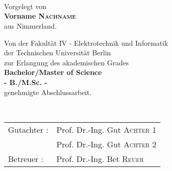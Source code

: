 \begin{titlepage}
\begin{center}
\vspace*{2.0cm}
 \\
\vspace*{0.2cm}
 \\
\vspace*{0.2cm}
 \\

\vspace*{1.5cm}
\noindent \large {Vorgelegt von\\}
\vspace*{0.1cm}
\noindent \large {\bf Vorname \textsc{Nachname}} \\
\vspace*{0.1cm}
\noindent \large {aus Nimmerland.\\}
\vspace*{1.5cm}

\noindent \large {Von der Fakult\"at IV - Elektrotechnik und Informatik} \\
\vspace*{0.1cm}
\noindent \large {der Technischen Universit\"at Berlin} \\
\vspace*{0.1cm}
\noindent \large {zur Erlangung des akademischen Grades} \\
\vspace*{0.2cm}
\noindent \large {\bf Bachelor/Master of Science} \\
\vspace*{0.1cm}
\noindent \large {\bf - B./M.Sc. -} \\
\vspace*{0.2cm}
\noindent \large {genehmigte Abschlussarbeit.} \\
\vspace*{1.5cm}

\vspace*{0.1cm}
~\\
\begin{tabular}{ll}
      \vspace*{0.1cm}
      \noindent \large{Gutachter :}	& \noindent \large{Prof. Dr.-Ing. Gut \textsc{Achter 1}}\\
      \vspace*{0.1cm}
					& \noindent \large{Prof. Dr.-Ing. Gut \textsc{Achter 2}}\\
	\vspace*{0.1cm}
	\noindent \large{Betreuer :}	& \noindent \large{Prof. Dr.-Ing. Bet \textsc{Reuer}}
\end{tabular}

\vspace*{1.5cm}

\end{center}
\end{titlepage}
\sloppy

\titlepage
